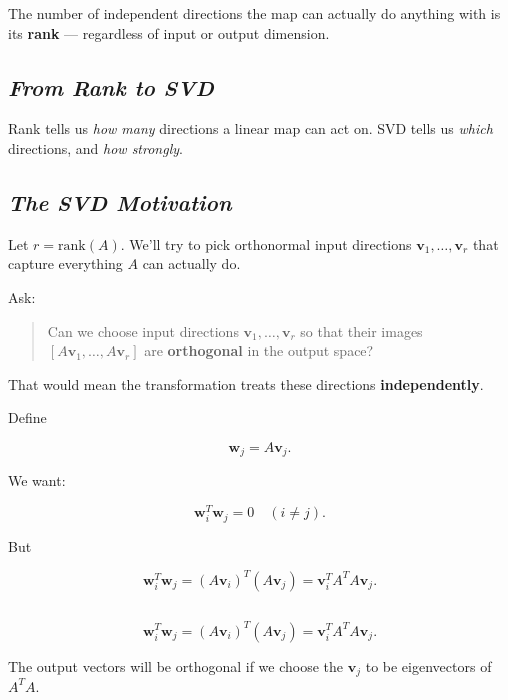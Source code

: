 \documentclass[
  letterpaper,
  DIV=11,
  numbers=noendperiod]{scrartcl}
\begin{document}
The number of independent directions the map can actually do anything
with is its \textbf{rank} --- regardless of input or output dimension.

\subsection{\texorpdfstring{\emph{From Rank to
SVD}}{From Rank to SVD}}\label{from-rank-to-svd}

Rank tells us \emph{how many} directions a linear map can act on. SVD
tells us \emph{which} directions, and \emph{how strongly}.

\subsection{\texorpdfstring{\emph{The SVD
Motivation}}{The SVD Motivation}}\label{the-svd-motivation}

Let \(r = \mathrm{rank}(A)\). We'll try to pick orthonormal input
directions \(\mathbf{v}_1,\dots,\mathbf{v}_r\) that capture everything
\(A\) can actually do.

Ask:

\begin{quote}
Can we choose input directions \(\mathbf{v}_1,\dots,\mathbf{v}_r\) so
that their images \([A\mathbf{v}_1,\dots,A\mathbf{v}_r]\) are
\textbf{orthogonal} in the output space?
\end{quote}

That would mean the transformation treats these directions
\textbf{independently}.

Define

\[
\mathbf{w}_j = A\mathbf{v}_j.
\]

We want:

\[
\mathbf{w}_i^T \mathbf{w}_j = 0 \quad (i \ne j).
\]

But

\[
\mathbf{w}_i^T \mathbf{w}_j
= (A\mathbf{v}_i)^T(A\mathbf{v}_j)
= \mathbf{v}_i^T A^T A \mathbf{v}_j.
\]

\subsection{\texorpdfstring{\emph{}}{}}\label{section-1}

\[
\mathbf{w}_i^T \mathbf{w}_j
= (A\mathbf{v}_i)^T(A\mathbf{v}_j)
= \mathbf{v}_i^T A^T A \mathbf{v}_j.
\]

The output vectors will be orthogonal if we choose the \(\mathbf{v}_j\)
to be eigenvectors of \(A^T A\).
\end{document}
